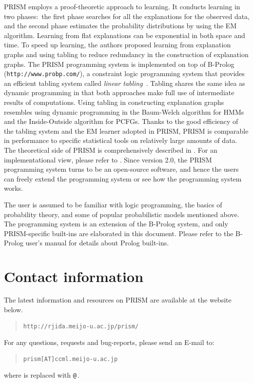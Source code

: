 \documentclass[a4paper]{report}
\makeatletter
\let\tts@ve\tt
\def\tt{\tts@ve\ifmmode\def\_{\mathchar`\_}\else\def\_{\char`\_}\fi}
\makeatother
\begin{document}
PRISM employs a proof-theoretic approach to learning. It conducts learning
in two phases:\ the first phase searches for all the explanations for the
observed data, and the second phase estimates the probability distributions
by using the EM algorithm. Learning from flat explanations can be
exponential in both space and time. To speed up learning, the authors
proposed learning from explanation graphs and using tabling to reduce
redundancy in the construction of explanation graphs.  The PRISM programming
system is implemented on top of B-Prolog ({\tt http://www.probp.com/}),
a constraint logic programming system that provides
an efficient tabling system called {\em linear tabling}~\cite{Zhou03b}.
Tabling shares the same idea as dynamic programming in that
both approaches make full use of intermediate
results of computations. Using tabling in constructing explanation graphs
resembles using dynamic programming in the Baum-Welch algorithm for HMMs  and
the Inside-Outside algorithm for PCFGs. Thanks to the good efficiency of
the tabling system and the EM learner adopted in PRISM, PRISM is comparable
in performance to specific statistical tools on relatively large amounts of
data.  The theoretical side of PRISM is comprehensively described in
\cite{Sato01b}.  For an implementational view, please refer to \cite{Zhou03a}.
Since version 2.0, the PRISM programming system turns to be an open-source
software, and hence the users can freely extend the programming system or
see how the programming system works.

The user is assumed to be familiar with logic programming, the basics of
probability theory, and some of popular probabilistic models mentioned above.
The programming system is an extension of the B-Prolog system, and only
PRISM-specific built-ins are elaborated in this document. Please refer
to the B-Prolog user's manual for details about Prolog built-ins.

\section*{Contact information}
\label{contact}

The latest information and resources on PRISM are available at
the website below.
\begin{quote}
{\tt http://rjida.meijo-u.ac.jp/prism/}
\end{quote}
For any questions, requests and bug-reports, please send an E-mail to:
\begin{quote}
{\tt prism[AT]ccml.meijo-u.ac.jp}

\end{quote}
where {\tt [AT]} is replaced with \verb|@|\,.
\end{document}
